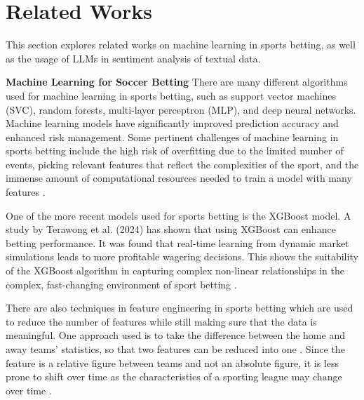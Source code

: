 \documentclass[conference]{IEEEtran}
\begin{document}



\section{Related Works}
This section explores related works on machine learning in sports betting, as well as the usage of LLMs in sentiment analysis of textual data.

\noindent\textbf{Machine Learning for Soccer Betting}
There are many different algorithms used for machine learning in sports betting, such as support vector machines (SVC), random forests, multi-layer perceptron (MLP), and deep neural networks. Machine learning models have significantly improved prediction accuracy and enhanced risk management. Some pertinent challenges of machine learning in sports betting include the high risk of overfitting due to the limited number of events, picking relevant features that reflect the complexities of the sport, and the immense amount of computational resources needed to train a model with many features \cite{galekwa2024systematic}.

One of the more recent models used for sports betting is the XGBoost model. A study by Terawong et al. (2024) has shown that using XGBoost can enhance betting performance. It was found that real-time learning from dynamic market simulations leads to more profitable wagering decisions. This shows the suitability of the XGBoost algorithm in capturing complex non-linear relationships in the complex, fast-changing environment of sport betting \cite{terawong2024xgboost}.

There are also techniques in feature engineering in sports betting which are used to reduce the number of features while still making sure that the data is meaningful. One approach used is to take the difference between the home and away teams' statistics, so that two features can be reduced into one \cite{walsh2024machine}. Since the feature is a relative figure between teams and not an absolute figure, it is less prone to shift over time as the characteristics of a sporting league may change over time \cite{dutta2017identifying}.
\end{document}
